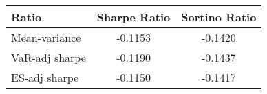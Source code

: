 \begin{tabular}{lcc}
\toprule
Ratio & Sharpe Ratio & Sortino Ratio\\
\midrule
Mean-variance & -0.1153 & -0.1420\\
VaR-adj sharpe & -0.1190 & -0.1437\\
ES-adj sharpe & -0.1150 & -0.1417\\
\bottomrule
\end{tabular}
